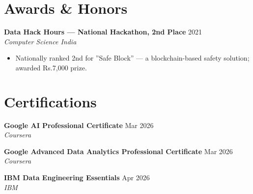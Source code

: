 \documentclass[10pt,letterpaper]{article}
\begin{document}
\section{Awards \& Honors}

\textbf{Data Hack Hours --- National Hackathon, 2nd Place} \hfill 2021 \\
\textit{Computer Science India}
\begin{itemize}
  \item Nationally ranked 2nd for ''Safe Block'' --- a blockchain-based safety solution; awarded Rs.7,000 prize.
\end{itemize}

\section{Certifications}

\textbf{Google AI Professional Certificate} \hfill Mar 2026 \\
\textit{Coursera}

\textbf{Google Advanced Data Analytics Professional Certificate} \hfill Mar 2026 \\
\textit{Coursera}

\textbf{IBM Data Engineering Essentials} \hfill Apr 2026 \\
\textit{IBM}
\end{document}
